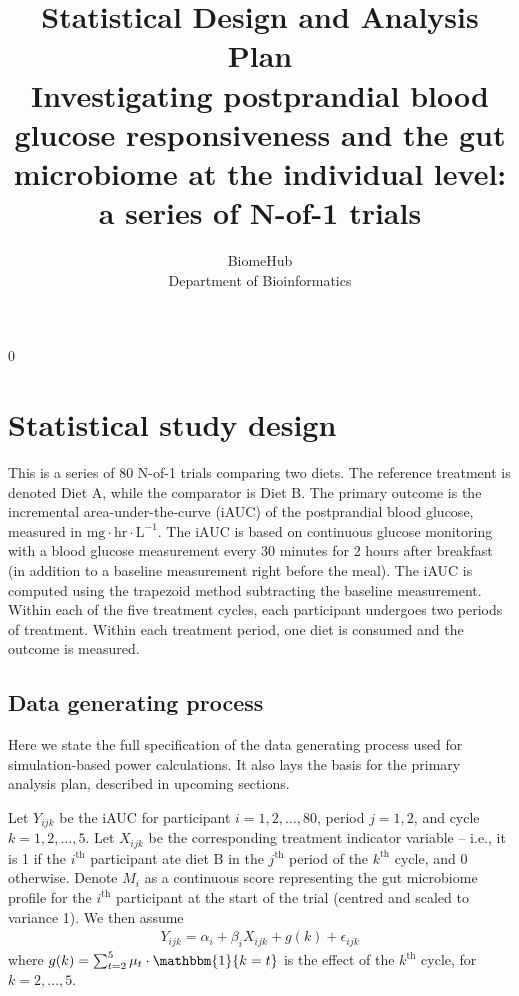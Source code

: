 \documentclass[12pt]{article}
\newcommand{\blind}{0}
\begin{document}
%

\def\spacingset#1{\renewcommand{\baselinestretch}%
{#1}\small\normalsize} \spacingset{1}



\blind
{
  \title{\textbf{{\Huge Statistical Design and Analysis Plan}\\[12pt]Investigating postprandial blood glucose responsiveness and the gut microbiome at the individual level: a series of N-of-1 trials}}
  \author{BiomeHub\\Department of Bioinformatics}
  \maketitle
} \fi

\tableofcontents

\spacingset{1.15}
\section{Statistical study design}
\label{sec:intro}
This is a series of 80 N-of-1 trials comparing two diets. The reference treatment is denoted Diet A, while the comparator is Diet B. The primary outcome is the incremental area-under-the-curve (iAUC) of the postprandial blood glucose, measured in $\textrm{mg}\cdot \textrm{hr}\cdot \textrm{L}^{-1}$. The iAUC is based on continuous glucose monitoring with a blood glucose measurement every 30 minutes for 2 hours after breakfast (in addition to a baseline measurement right before the meal). The iAUC is computed using the trapezoid method subtracting the baseline measurement. Within each of the five treatment cycles, each participant undergoes two periods of treatment. Within each treatment period, one diet is consumed and the outcome is measured.

\subsection{Data generating process}

Here we state the full specification of the data generating process used for simulation-based power calculations. It also lays the basis for the primary analysis plan, described in upcoming sections.

Let $Y_{ijk}$ be the iAUC for participant $i=1, 2, \dots, 80$, period $j=1,2$, and cycle $k=1,2,\dots, 5$. Let $X_{ijk}$ be the corresponding treatment indicator variable -- i.e., it is 1 if the $i^{\textrm{th}}$ participant ate diet B in the $j^{\textrm{th}}$ period of the $k^{\textrm{th}}$ cycle, and 0 otherwise. Denote $M_i$ as a continuous score representing the gut microbiome profile for the $i^{\textrm{th}}$ participant at the start of the trial (centred and scaled to variance 1). We then assume
\begin{align}
    Y_{ijk} = \alpha_i + \beta_i X_{ijk} + g(k) + \epsilon_{ijk}\label{outcome-model}
\end{align}
where $g(k)=\sum_{t=2}^5 \mu_t \cdot \mathbbm{1}\{k=t\}$ is the effect of the $k^{\textrm{th}}$ cycle, for $k=2, \dots, 5$. 
\end{document}
